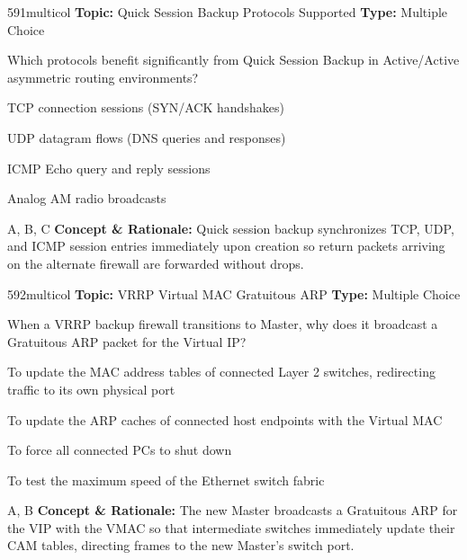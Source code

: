 \begin{qcard}{591}{multicol}
\textcolor{darkslate!75}{\small\textbf{Topic:} Quick Session Backup Protocols Supported \hfill \textbf{Type:} Multiple Choice}\vspace{0.4em}\par
Which protocols benefit significantly from Quick Session Backup in Active/Active asymmetric routing environments?
\begin{qoptions}
\item TCP connection sessions (SYN/ACK handshakes)
\item UDP datagram flows (DNS queries and responses)
\item ICMP Echo query and reply sessions
\item Analog AM radio broadcasts
\end{qoptions}
\end{qcard}
\nopagebreak
\begin{explainbox}{A, B, C}
\textbf{Concept \& Rationale:} Quick session backup synchronizes TCP, UDP, and ICMP session entries immediately upon creation so return packets arriving on the alternate firewall are forwarded without drops.
\end{explainbox}

\begin{qcard}{592}{multicol}
\textcolor{darkslate!75}{\small\textbf{Topic:} VRRP Virtual MAC Gratuitous ARP \hfill \textbf{Type:} Multiple Choice}\vspace{0.4em}\par
When a VRRP backup firewall transitions to Master, why does it broadcast a Gratuitous ARP packet for the Virtual IP?
\begin{qoptions}
\item To update the MAC address tables of connected Layer 2 switches, redirecting traffic to its own physical port
\item To update the ARP caches of connected host endpoints with the Virtual MAC
\item To force all connected PCs to shut down
\item To test the maximum speed of the Ethernet switch fabric
\end{qoptions}
\end{qcard}
\nopagebreak
\begin{explainbox}{A, B}
\textbf{Concept \& Rationale:} The new Master broadcasts a Gratuitous ARP for the VIP with the VMAC so that intermediate switches immediately update their CAM tables, directing frames to the new Master's switch port.
\end{explainbox}

